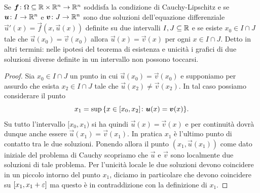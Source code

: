 \begin{proposition}
\label{prop:separazione_soluzioni}
Se $\boldsymbol f\colon \Omega\subseteq \mathbb R \times \mathbb R^n\to \mathbb R^n$ soddisfa
la condizione di Cauchy-Lipschitz
e se $\boldsymbol u\colon I \to \mathbb R^n$ e $\boldsymbol v\colon J\to\mathbb R^n$ sono due soluzioni
dell'equazione differenziale
$\vec u'(x) = \vec f(x,\vec u(x))$
definite su due intervalli $I,J \subseteq \mathbb R$  e se esiste $x_0\in I\cap J$ tale che $\vec u(x_0) = \vec v(x_0)$ allora $\vec u(x) = \vec v(x)$ per ogni $x\in I\cap J$.
Detto in altri termini: nelle ipotesi del teorema di esistenza e unicità i grafici di due soluzioni diverse definite in un intervallo non possono toccarsi.
\end{proposition}
%
\begin{proof}
Sia $x_0 \in I\cap J$ un punto in cui $\vec u(x_0) = \vec v(x_0)$
e supponiamo per assurdo che esista $x_2 \in I\cap J$ tale che $\vec u(x_2)\neq \vec v(x_2)$. In tal caso possiamo considerare il punto
\[
   x_1 = \sup {\left\{ x \in [x_0,x_2] \colon \boldsymbol u(x) = \boldsymbol v(x) \right\}}.
\]
Su tutto l'intervallo $[x_0,x_1)$ si ha quindi $\vec u(x) = \vec v(x)$ e per continuità dovrà dunque anche essere $\vec u(x_1) =  \vec v(x_1)$.
In pratica $x_1$ è l'ultimo punto di contatto tra le due soluzioni.
Ponendo allora il punto $(x_1,\vec u(x_1))$ come dato iniziale del problema di Cauchy scopriamo che $\vec u$ e $\vec v$ sono localmente due soluzioni di tale problema. Per l'unicità locale le due soluzioni devono coincidere in un piccolo intorno del punto $x_1$, diciamo in particolare che devono coincidere su $[x_1,x_1+\varepsilon]$ ma questo è in contraddizione con la definizione di $x_1$.
\end{proof}

